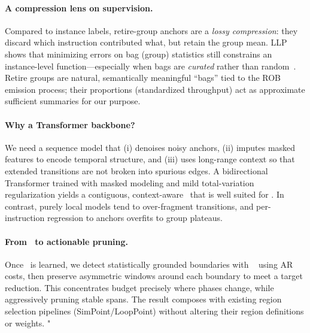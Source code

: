 \paragraph{A compression lens on supervision.}
Compared to instance labels, retire-group anchors are a \emph{lossy compression}: they discard which instruction contributed what, but retain the group mean. LLP shows that minimizing errors on bag (group) statistics still constrains an instance-level function—especially when bags are \emph{curated} rather than random~\cite{yu2014-llp,scott2020-llp,law2018-agg,zhang2020-agg}. Retire groups are natural, semantically meaningful “bags” tied to the ROB emission process; their proportions (standardized throughput) act as approximate sufficient summaries for our purpose.
\paragraph{Why a Transformer backbone?}
We need a sequence model that (i) denoises noisy anchors, (ii) imputes masked features to encode temporal structure, and (iii) uses long-range context so that extended transitions are not broken into spurious edges. A bidirectional Transformer trained with masked modeling and mild total-variation regularization yields a contiguous, context-aware \pts\ that is well suited for \cpd. In contrast, purely local models tend to over-fragment transitions, and per-instruction regression to anchors overfits to group plateaus.
\paragraph{From \pts\ to actionable pruning.}
Once \pts\ is learned, we detect statistically grounded boundaries with \pelt~\cite{pelt12,ruptures20} using AR costs, then preserve asymmetric windows around each boundary to meet a target reduction. This concentrates budget precisely where phases change, while aggressively pruning stable spans. The result composes with existing region selection pipelines (SimPoint/LoopPoint) without altering their region definitions or weights.
"
